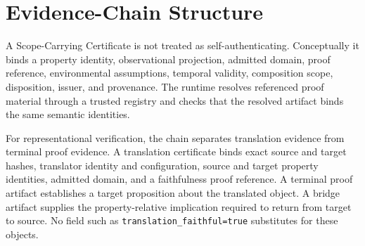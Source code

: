\section{Evidence-Chain Structure}
A Scope-Carrying Certificate is not treated as self-authenticating. Conceptually it binds a property identity, observational projection, admitted domain, proof reference, environmental assumptions, temporal validity, composition scope, disposition, issuer, and provenance. The runtime resolves referenced proof material through a trusted registry and checks that the resolved artifact binds the same semantic identities.

For representational verification, the chain separates translation evidence from terminal proof evidence. A translation certificate binds exact source and target hashes, translator identity and configuration, source and target property identities, admitted domain, and a faithfulness proof reference. A terminal proof artifact establishes a target proposition about the translated object. A bridge artifact supplies the property-relative implication required to return from target to source. No field such as \texttt{translation\_faithful=true} substitutes for these objects.